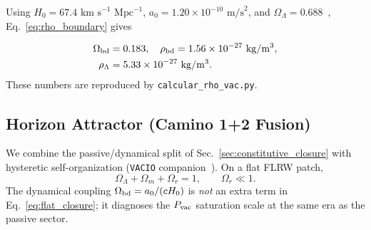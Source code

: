 \documentclass[prd,
               reprint,
               aps,
               preprintnumbers,
               nofootinbib,
               longbibliography,
               floatfix]{revtex4-2}
\begin{document}
Using $H_0 = 67.4\text{ km s}^{-1}\text{ Mpc}^{-1}$, $a_0 = 1.20 \times
10^{-10}\text{ m/s}^2$, and $\Omega_\Lambda = 0.688$~\cite{Planck2020},
Eq.~\eqref{eq:rho_boundary} gives

\begin{equation}
\label{eq:numerical_densities}
\begin{aligned}
\Omega_{\rm bd} &= 0.183, \quad 
\rho_{\rm bd} = 1.56 \times 10^{-27}~\mathrm{kg/m^3}, \\
\rho_\Lambda &= 5.33 \times 10^{-27}~\mathrm{kg/m^3}.
\end{aligned}
\end{equation}
These numbers are reproduced by \texttt{calcular\_rho\_vac.py}.


\subsection{Horizon Attractor (Camino 1+2 Fusion)}
\label{sec:horizon_attractor}

We combine the passive/dynamical split of
Sec.~\ref{sec:constitutive_closure} with hysteretic self-organization
(\texttt{VACIO} companion~\cite{Weinberg1989}).
On a flat FLRW patch,
\begin{equation}
\label{eq:flat_closure}
\Omega_\Lambda+\Omega_m+\Omega_r=1,
\qquad \Omega_r\ll 1.
\end{equation}
The dynamical coupling $\Omega_{\rm bd}=a_0/(cH_0)$ is \emph{not} an extra
term in Eq.~\eqref{eq:flat_closure}; it diagnoses the $P_{\rm vac}$
saturation scale at the same era as the passive sector.
\end{document}
